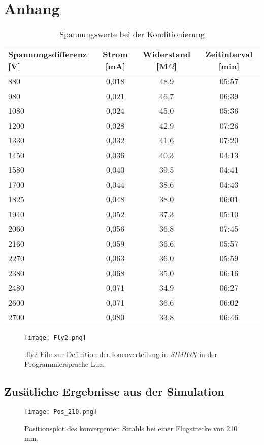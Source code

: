 \appendix
\chapter{Anhang}
\begin{table}[H]
    \caption{Spannungswerte bei der Konditionierung}
    \label{tab:Konditionierung}
    \begin{tabular}{lccc}
        \toprule
        Spannungsdifferenz [V] & Strom [mA] &	Widerstand [M$\Omega$] & Zeitinterval [min]\\   
        \midrule
            880  & 0,018 & 48,9 & 05:57\\
            980  & 0,021 & 46,7 & 06:39\\
            1080 & 0,024 & 45,0 & 05:36\\
            1200 & 0,028 & 42,9 & 07:26\\
            1330 & 0,032 & 41,6 & 07:20\\
            1450 & 0,036 & 40,3 & 04:13\\
            1580 & 0,040 & 39,5 & 04:41\\
            1700 & 0,044 & 38,6 & 04:43\\
            1825 & 0,048 & 38,0 & 06:01\\
            1940 & 0,052 & 37,3 & 05:10\\
            2060 & 0,056 & 36,8 & 07:45\\
            2160 & 0,059 & 36,6 & 05:57\\
            2270 & 0,063 & 36,0 & 05:59\\
            2380 & 0,068 & 35,0 & 06:16\\
            2480 & 0,071 & 34,9 & 06:27\\
            2600 & 0,071 & 36,6 & 06:02\\
            2700 & 0,080 & 33,8 & 06:46\\   
        \bottomrule     
    \end{tabular}
\end{table}

\begin{figure}[H]
    \centering
    \texttt{[image: Fly2.png]}
    \caption[Ionenverteilung .fly2-File]{.fly2-File zur Definition der Ionenverteilung in \textit{SIMION} in der Programmiersprache Lua.}
    \label{fly2}
\end{figure}

\section{Zusätliche Ergebnisse aus der Simulation}
\begin{figure}[H]
    \centering
    \texttt{[image: Pos\_210.png]}
    \caption[Positionsplot des konvergenten Strahls]{Positionsplot des konvergenten Strahls bei einer Flugstrecke von 210 mm.}
    \label{fig:pos_210}
\end{figure}

